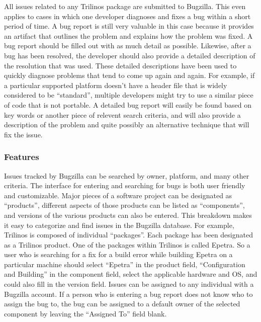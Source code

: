 \documentclass[12pt,relax]{article}
\begin{document}
All issues related to any Trilinos package are submitted to Bugzilla.  This 
even applies to cases in which 
one developer diagnoses and fixes a bug within a short period of time.  A bug 
report is still very valuable in this case because it provides an artifact 
that outlines the problem and explains how the problem was fixed.  A bug 
report should be filled out with as much detail as possible.  Likewise, after 
a bug has been resolved, the developer should also provide a detailed 
description of the resolution that was used.  These detailed descriptions have 
been used to quickly diagnose problems that tend to come up again and again.
For example, if a particular supported platform doesn't have a header file 
that is widely considered to be ``standard'', multiple developers might try 
to use a similar piece of code that is not portable.  A detailed bug report 
will easily be found based on key words or another piece of relevent search 
criteria, and will also provide a description of the problem and quite 
possibly an alternative technique that will fix the issue. 

\subsubsection{Features}

Issues tracked by Bugzilla can be searched by owner, platform, and many other 
criteria.  The 
interface for entering and searching for bugs is both user friendly and 
customizable.  Major pieces of a software project can be 
designated as ``products'', different aspects of those products can be 
listed as ``components'', and versions of the various products can also be 
entered.  This breakdown makes it easy to categorize and find issues in the 
Bugzilla database.  For example, Trilinos is composed of individual 
``packages''.  Each package has been designated as a Trilinos product.  One of 
the packages within Trilinos is called Epetra.  So a user who is searching for 
a fix for a build error while building Epetra on a particular 
machine should select ``Epetra'' in the product field, ``Configuration and 
Building'' in the component field, select the applicable hardware and OS, and
could also fill in the version field.  Issues can be assigned to any 
individual with a Bugzilla account.  If a 
person who is entering a bug report does not know who to assign the bug to,
the bug can be assigned to a default owner of the selected component 
by leaving the ``Assigned To'' field blank.  
\end{document}
